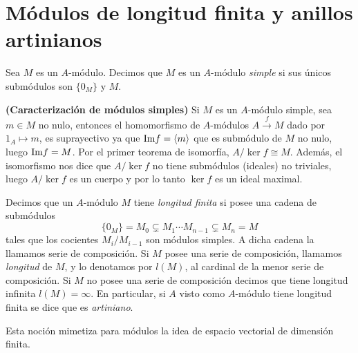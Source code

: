 \documentclass[../main.tex]{subfiles}
\begin{document}
\section{Módulos de longitud finita y anillos artinianos}
\begin{definition}
Sea $M$ es un $A$-módulo. Decimos que $M$ es un $A$-módulo \textit{simple} si sus únicos submódulos son $\{0_M\}$ y $M.$
\end{definition}

\begin{remark} \textnormal{\textbf{(Caracterización de módulos simples)}} \label{obs_simple}
Si $M$ es un $A$-módulo simple, sea $m\in M$ no nulo, entonces el homomorfismo de $A$-módulos $A\overset{f}{\rightarrow} M$ dado por $1_A\mapsto m$, es suprayectivo ya que $\text{Im} f = \langle m \rangle$ que es submódulo de $M$ no nulo, luego $\text{Im} f = M$. Por el primer teorema de isomorfía,  $A/\ker{f}\cong M$. Además, el isomorfismo nos dice que $A/\ker f$ no tiene submódulos (ideales) no triviales, luego $A/\ker f$ es un cuerpo y por lo tanto $\ker f$ es un ideal maximal.
\end{remark}

\begin{definition}
Decimos que un $A$-módulo $M$ tiene \textit{longitud finita} si posee una cadena de submódulos
$$\{0_M\}=M_0\subsetneq M_1\cdots M_{n-1}\subsetneq M_n=M$$
tales que los cocientes $M_i/M_{i-1}$ son módulos simples. A dicha cadena la llamamos serie de composición. Si $M$ posee una serie de composición, llamamos \textit{longitud} de $M$, y lo denotamos por $l(M)$, al cardinal de la menor serie de composición. Si $M$ no posee una serie de composición decimos que tiene longitud infinita $l(M)=\infty.$ En particular, si $A$ visto como $A$-módulo tiene longitud finita se dice que es \emph{artiniano}.
\end{definition}

Esta noción mimetiza para módulos la idea de espacio vectorial de dimensión finita.
\end{document}
